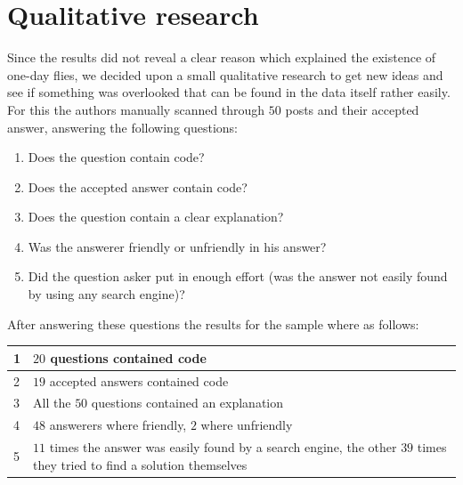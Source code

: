 \documentclass[conference]{IEEEtran}
\begin{document}
\section{Qualitative research}\label{QualitativeResearch}
Since the results did not reveal a clear reason which explained the existence of one-day flies, we decided upon a small qualitative research to get new ideas and see if something was overlooked that can be found in the data itself rather easily.  For this the authors manually scanned through $50$ posts and their accepted answer, answering the following questions:

\begin{enumerate}
\item Does the question contain code?
\item Does the accepted answer contain code?
\item Does the question contain a clear explanation?
\item Was the answerer friendly or unfriendly in his answer?
\item Did the question asker put in enough effort (was the answer not easily found by using any search engine)?
\end{enumerate}

After answering these questions the results for the sample where as follows:
\newline
\newline
\begin{tabular}{ | l | p{8cm} | }
\hline
  1 & $20$ questions contained code \\
\hline
  2 & $19$ accepted answers contained code \\
\hline
  3 & All the $50$ questions contained an explanation \\
\hline
  4 & $48$ answerers where friendly, $2$ where unfriendly \\
\hline
  5 & $11$ times the answer was easily found by a search engine, the other $39$ times they tried to find a solution themselves \\
\hline
\end{tabular}
\newline
\newline
\end{document}
